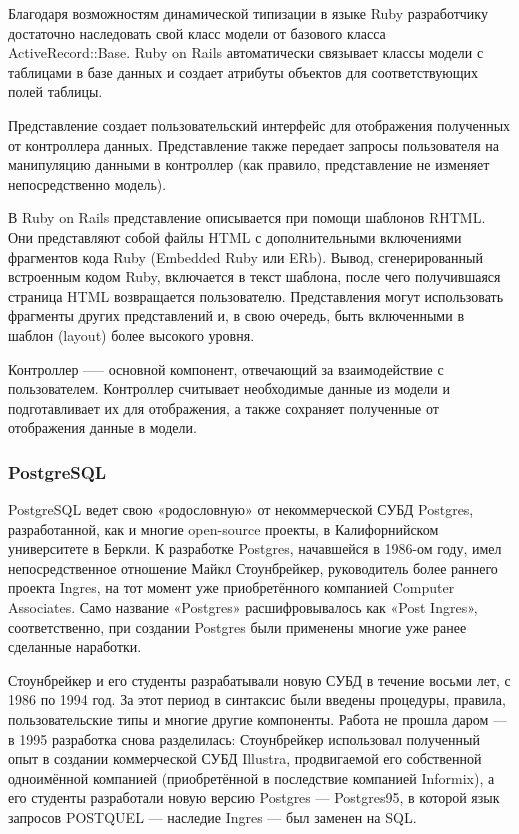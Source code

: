 Благодаря возможностям динамической типизации в языке Ruby разработчику достаточно наследовать свой класс модели от базового класса ActiveRecord::Base. Ruby on Rails автоматически связывает классы модели с таблицами в базе данных и создает атрибуты объектов для соответствующих полей таблицы.

Представление создает пользовательский интерфейс для отображения полученных от контроллера данных. Представление также передает запросы пользователя на манипуляцию данными в контроллер (как правило, представление не изменяет непосредственно модель).

В Ruby on Rails представление описывается при помощи шаблонов RHTML. Они представляют собой файлы HTML с дополнительными включениями фрагментов кода Ruby (Embedded Ruby или ERb). Вывод, сгенерированный встроенным кодом Ruby, включается в текст шаблона, после чего получившаяся страница HTML возвращается пользователю. Представления могут использовать фрагменты других представлений и, в свою очередь, быть включенными в шаблон (layout) более высокого уровня.

Контроллер —-- основной компонент, отвечающий за взаимодействие с пользователем. Контроллер считывает необходимые данные из модели и подготавливает их для отображения, а также сохраняет полученные от отображения данные в модели.

\subsubsection{PostgreSQL}

PostgreSQL ведет свою «родословную» от некоммерческой СУБД Postgres, разработанной, как и многие open-source проекты, в Калифорнийском университете в Беркли. К разработке Postgres, начавшейся в 1986-ом году, имел непосредственное отношение Майкл Стоунбрейкер, руководитель более раннего проекта Ingres, на тот момент уже приобретённого компанией Computer Associates. Само название «Postgres» расшифровывалось как «Post Ingres», соответственно, при создании Postgres были применены многие уже ранее сделанные наработки.

Стоунбрейкер и его студенты разрабатывали новую СУБД в течение восьми лет, с 1986 по 1994 год. За этот период в синтаксис были введены процедуры, правила, пользовательские типы и многие другие компоненты. Работа не прошла даром — в 1995 разработка снова разделилась: Стоунбрейкер использовал полученный опыт в создании коммерческой СУБД Illustra, продвигаемой его собственной одноимённой компанией (приобретённой в последствие компанией Informix), а его студенты разработали новую версию Postgres — Postgres95, в которой язык запросов POSTQUEL — наследие Ingres — был заменен на SQL.

